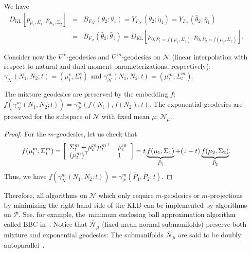 \documentclass[entropy,article,accept,oneauthor,pdftex,entropy]{Definitions/mdpi}
\def\barN{{\overline{\mathcal{N}}}}
\def\KL{\mathrm{KL}}
\def\mattwotwo#1#2#3#4{{\left[\begin{array}{ll}#1 & #2\cr #3 & #4\end{array}\right]}}
\def\calN{\mathcal{N}}
\def\calP{\mathcal{P}}
\def\barP{{\bar P}}
\begin{document}
\begin{Proposition}\label{prop:embedpot}
We have
\begin{eqnarray*}
D_\KL[p_{\mu_1,\Sigma_1}:p_{\mu_2,\Sigma_2}]&=&
B_{F_\calN}(\theta_2:\theta_1)=Y_{F_\calN}(\theta_2:\eta_1)
=Y_{F_\calP}(\bar\theta_2:\bar\eta_1)\\
&=& 
B_{F_\calP}(\bar\theta_2:\bar\theta_1)=
D_\KL[p_{0,\bar P_1=f(\mu_1,\Sigma_2)}:p_{0,\bar P_2=f(\mu_2,\Sigma_2)}].
\end{eqnarray*}
\end{Proposition}


Consider now the $\nabla^e$-geodesics and $\nabla^m$-geodesics on $\calN$ (linear interpolation with respect to natural and dual moment parameterizations, respectively):
$\gamma_\calN^e(N_1,N_2;t)=(\mu_t^e,\Sigma_t^e)$ and
$\gamma_\calN^m(N_1,N_2;t)=(\mu_t^m,\Sigma_t^m)$.

\begin{Proposition}\label{prop:geo}
The mixture geodesics are preserved by the embedding $f$: 
$f(\gamma_\calN^m(N_1,N_2;t))=\gamma_\calP^m(f(N_1),f(N_2);t)$.
The exponential geodesics are preserved for the subspace of $\calN$ with fixed mean $\mu$: $\calN_\mu$.
\end{Proposition}

\begin{proof}
For the $m$-geodesics, let us check that 
$$
f(\mu_t^m,\Sigma_t^m)=
\mattwotwo{\Sigma_t^m+\mu_t^m{\mu_t^m}^\top}{\mu_t^m}{(\mu_t^m)^\top}{1}=
t \underbrace{f(\mu_1,\Sigma_1)}_{\bar P_1}+(1-t)\underbrace{f(\mu_2,\Sigma_2)}_{\barP_2},
$$
Thus, we have $f(\gamma_\calN^m(N_1,N_2;t))=\gamma_\calP^m(\bar P_1,\bar P_2;t)$.
\end{proof}
 
 
Therefore, all algorithms on $\calN$ which only require $m$-geodesics or $m$-projections~\cite{IG-2016} by minimizing the right-hand side of the KLD can be implemented by algorithms on $\calP$. See, for example, the~minimum enclosing ball approximation algorithm called BBC in~\cite{BBC-2005}. 
Notice that $\barN_\mu$ (fixed mean normal submanifolds) preserve both mixture and exponential geodesics: 
The submanifolds $\barN_\mu$ are said to be doubly autoparallel~\cite{ohara2019doubly}.
\end{document}
